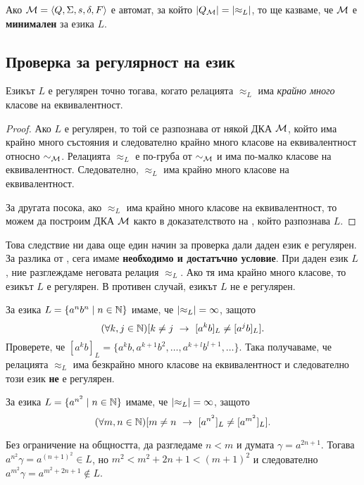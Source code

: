Ако $\mathcal{M} = \langle{Q,\Sigma,s,\delta,F}\rangle$ е автомат, за който $\lvert{Q_{\mathcal{M}}}\rvert = \lvert{\approx_L}\rvert$, то ще казваме, че
$\mathcal{M}$ е {\bf минимален} за езика $L$.

\subsection{Проверка за регулярност на език}

\begin{framed}
  \begin{cor}
    Езикът $L$ е регулярен точно тогава, когато релацията $\approx_L$ има {\em крайно много} класове на еквивалентност.
  \end{cor}
\end{framed}
\begin{proof}
  Ако $L$ е регулярен, то той се разпознава от някой ДКА $\mathcal{M}$, който има крайно много състояния 
  и следователно крайно много класове на еквивалентност относно $\sim_{\mathcal{M}}$.
  Релацията $\approx_L$ е по-груба от $\sim_{\mathcal{M}}$ и има по-малко класове на еквивалентност.
  Следователно, $\approx_L$ има крайно много класове на еквивалентност.
  
  За другата посока, ако $\approx_L$ има крайно много класове на еквивалентност, то можем да 
  построим ДКА $\mathcal{M}$ както в доказателството на , който разпознава $L$.
\end{proof}

Това следствие ни дава още един начин за проверка дали даден език е регулярен.
За разлика от , сега имаме {\bf необходимо и достатъчно условие}.
При даден език $L$, ние разглеждаме неговата релация $\approx_L$.
Ако тя има крайно много класове, то езикът $L$ е регулярен.
В противен случай, езикът $L$ не е регулярен.

\begin{example}
  За езика $L = \{a^nb^n\mid n \in \mathbb{N}\}$ имаме, че $\lvert{\approx_L}\rvert = \infty$,
  защото \[(\forall k,j\in\mathbb{N})[k \neq j\ \rightarrow\ [a^kb]_L \neq [a^jb]_L].\]
  Проверете, че $[a^kb]_L = \{a^kb,a^{k+1}b^{2},\dots,a^{k+l}b^{l+1},\dots\}$.
  Така получаваме, че релацията $\approx_L$ има безкрайно много класове на еквивалентност
  и следователно този език {\bf не} е регулярен.
\end{example}

\begin{example}
  За езика $L = \{a^{n^2} \mid n \in \mathbb{N}\}$ имаме, че $\lvert{\approx_L}\rvert = \infty$,
  защото \[(\forall m,n\in\mathbb{N})[m \neq n\ \rightarrow\ [a^{n^2}]_L \neq [a^{m^2}]_L].\]
  
  Без ограничение на общността, да разгледаме $n < m$ и думата $\gamma = a^{2n+1}$.
  Тогава $a^{n^2}\gamma = a^{(n+1)^2} \in L$, но 
  $m^2 < m^2 + 2n + 1 < (m+1)^2$ и следователно $a^{m^2}\gamma = a^{m^2+2n+1}\not\in L$.
\end{example}

